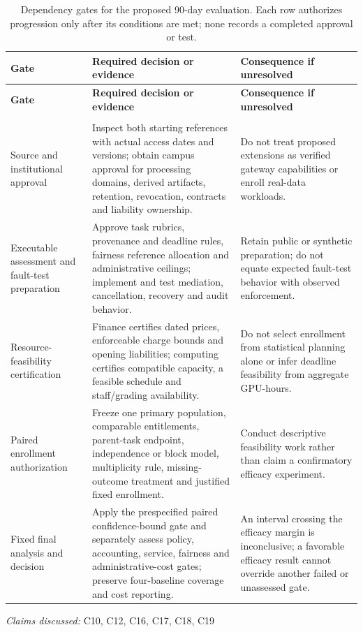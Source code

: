 \documentclass[11pt]{article}
\begin{document}
\begin{longtable}{@{}>{\raggedright\arraybackslash}p{}>{\raggedright\arraybackslash}p{}>{\raggedright\arraybackslash}p{}@{}}
\caption{Dependency gates for the proposed 90-day evaluation. Each row authorizes progression only after its conditions are met; none records a completed approval or test.}\\
\toprule
\textbf{Gate} & \textbf{Required decision or evidence} & \textbf{Consequence if unresolved}\\
\midrule
\endfirsthead
\toprule
\textbf{Gate} & \textbf{Required decision or evidence} & \textbf{Consequence if unresolved}\\
\midrule
\endhead
\midrule
\multicolumn{3}{r}{\footnotesize Continued on next page}\\
\endfoot
\bottomrule
\endlastfoot
Source and institutional approval & Inspect both starting references with actual access dates and versions; obtain campus approval for processing domains, derived artifacts, retention, revocation, contracts and liability ownership. & Do not treat proposed extensions as verified gateway capabilities or enroll real-data workloads.\\
Executable assessment and fault-test preparation & Approve task rubrics, provenance and deadline rules, fairness reference allocation and administrative ceilings; implement and test mediation, cancellation, recovery and audit behavior. & Retain public or synthetic preparation; do not equate expected fault-test behavior with observed enforcement.\\
Resource-feasibility certification & Finance certifies dated prices, enforceable charge bounds and opening liabilities; computing certifies compatible capacity, a feasible schedule and staff/grading availability. & Do not select enrollment from statistical planning alone or infer deadline feasibility from aggregate GPU-hours.\\
Paired enrollment authorization & Freeze one primary population, comparable entitlements, parent-task endpoint, independence or block model, multiplicity rule, missing-outcome treatment and justified fixed enrollment. & Conduct descriptive feasibility work rather than claim a confirmatory efficacy experiment.\\
Fixed final analysis and decision & Apply the prespecified paired confidence-bound gate and separately assess policy, accounting, service, fairness and administrative-cost gates; preserve four-baseline coverage and cost reporting. & An interval crossing the efficacy margin is inconclusive; a favorable efficacy result cannot override another failed or unassessed gate.\\
\end{longtable}
\par{}
\textit{Claims discussed: }C10, C12, C16, C17, C18, C19
\end{document}
